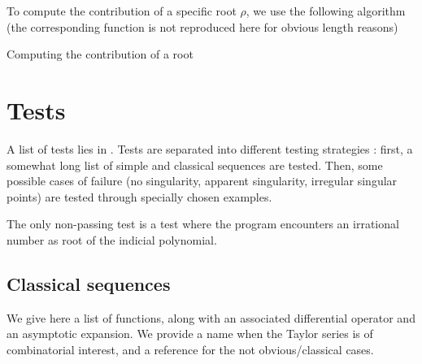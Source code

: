\documentclass[../main.tex]{subfiles}
\begin{document}
To compute the contribution of a specific root $\rho$, we use the following algorithm (the corresponding  function is not reproduced here for obvious length reasons)

\begin{algorithm}[H]
	\caption{Computing the contribution of a root}
	\SetAlgoLined
	
\end{algorithm}


\section{Tests}\label{section_implem_tests}

A list of tests lies in . Tests are separated into different testing strategies : first, a somewhat long list of simple and classical sequences are tested. Then, some possible cases of failure (no singularity, apparent singularity, irregular singular points) are tested through specially chosen examples.

The only non-passing test is a test where the program encounters an irrational number as root of the indicial polynomial.


\subsection*{Classical sequences}\label{subsection_classical_sequences}
We give here a list of functions, along with an associated differential operator and an asymptotic expansion. We provide a name when the Taylor series is of combinatorial interest, and a reference for the not obvious/classical cases.
\end{document}
